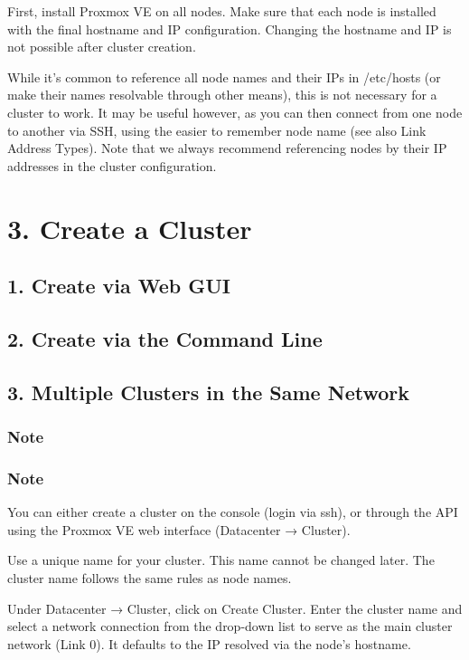 First, install Proxmox VE on all nodes. Make sure that each node is installed with the final hostname and IP configuration. Changing the hostname and IP is not possible after cluster creation.

While it’s common to reference all node names and their IPs in /etc/hosts (or make their names resolvable through other means), this is not necessary for a cluster to work. It may be useful however, as you can then connect from one node to another via SSH, using the easier to remember node name (see also Link Address Types). Note that we always recommend referencing nodes by their IP addresses in the cluster configuration.


\section{3. Create a Cluster}

\subsection{1. Create via Web GUI}

\subsection{2. Create via the Command Line}

\subsection{3. Multiple Clusters in the Same Network}

\subsubsection{Note}

\subsubsection{Note}

You can either create a cluster on the console (login via ssh), or through the API using the Proxmox VE web interface (Datacenter → Cluster).

Use a unique name for your cluster. This name cannot be changed later. The cluster name follows the same rules as node names.

Under Datacenter → Cluster, click on Create Cluster. Enter the cluster name and select a network connection from the drop-down list to serve as the main cluster network (Link 0). It defaults to the IP resolved via the node’s hostname.

